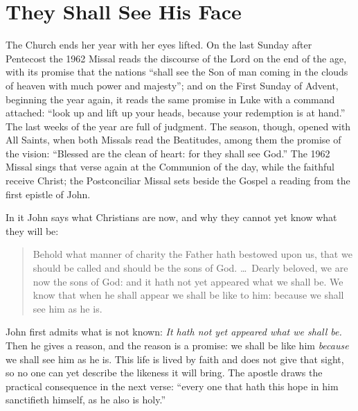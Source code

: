 \section{They Shall See His Face}

The Church ends her year with her eyes lifted. On the last Sunday after Pentecost the 1962 Missal reads the discourse of the Lord on the end of the age, with its promise that the nations ``shall see the Son of man coming in the clouds of heaven with much power and majesty''; and on the First Sunday of Advent, beginning the year again, it reads the same promise in Luke with a command attached: ``look up and lift up your heads, because your redemption is at hand.'' The last weeks of the year are full of judgment. The season, though, opened with All Saints, when both Missals read the Beatitudes, among them the promise of the vision: ``Blessed are the clean of heart: for they shall see God.'' The 1962 Missal sings that verse again at the Communion of the day, while the faithful receive Christ; the Postconciliar Missal sets beside the Gospel a reading from the first epistle of John.

In it John says what Christians are now, and why they cannot yet know what they will be:

\begin{quote}
Behold what manner of charity the Father hath bestowed upon us, that we should be called and should be the sons of God. \ldots\ Dearly beloved, we are now the sons of God: and it hath not yet appeared what we shall be. We know that when he shall appear we shall be like to him: because we shall see him as he is.
\end{quote}

John first admits what is not known: \emph{It hath not yet appeared what we shall be.} Then he gives a reason, and the reason is a promise: we shall be like him \emph{because} we shall see him as he is. This life is lived by faith and does not give that sight, so no one can yet describe the likeness it will bring. The apostle draws the practical consequence in the next verse: ``every one that hath this hope in him sanctifieth himself, as he also is holy.''

